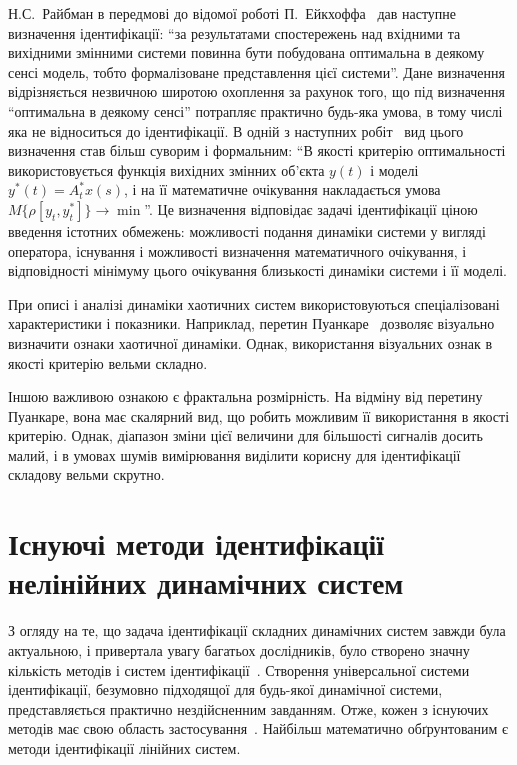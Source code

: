 Н.С.~Райбман в передмові до відомої роботі
П.~Ейкхоффа~\cite{eykhoff_id_base} дав наступне визначення ідентифікації:
``за результатами спостережень над вхідними та вихідними
змінними системи повинна бути побудована оптимальна в
деякому сенсі модель, тобто формалізоване представлення цієї
системи''. Дане визначення відрізняється незвичною широтою
охоплення за рахунок того, що під визначення ``оптимальна в
деякому сенсі'' потрапляє практично будь-яка умова, в тому числі яка не
відноситься до ідентифікації. В одній з наступних
робіт~\cite{raibman_id_obj_ctl} вид цього визначення став більш суворим і
формальним: ``В якості критерію оптимальності використовується
функція вихідних змінних об'єкта
$y(t) $ і моделі
$y^{*}(t) = A_t^{*} x (s) $, і на її математичне очікування накладається
умова
$ M \{\rho [y_t, y_t^{*}] \} \to{\min} $''.
Це визначення
відповідає задачі ідентифікації ціною введення істотних
обмежень: можливості подання динаміки системи у вигляді
оператора, існування і можливості визначення математичного
очікування, і відповідності мінімуму цього очікування
близькості динаміки системи і її моделі.







При описі і аналізі динаміки хаотичних систем
використовуються спеціалізовані характеристики і
показники. Наприклад, перетин Пуанкаре~\cite{moon_chaotic_vibr,
anisch_complex_vibrations_in_simple_systems, atu_st105} дозволяє візуально визначити
ознаки хаотичної динаміки. Однак, використання візуальних
ознак в якості критерію вельми складно.

Іншою важливою ознакою є фрактальна розмірність. На відміну від
перетину Пуанкаре, вона має скалярний вид, що робить можливим
її використання в якості критерію. Однак, діапазон зміни цієї
величини для більшості сигналів досить малий, і в умовах шумів
вимірювання виділити корисну для ідентифікації складову
вельми скрутно.


\section{Існуючі методи ідентифікації нелінійних динамічних систем}%

З огляду на те, що задача ідентифікації складних динамічних
систем завжди була актуальною, і привертала увагу багатьох
дослідників, було створено значну кількість методів і систем
ідентифікації~\cite{eykhoff_id_base, leondes_modern_tu, nelles_nlsys_id}. Створення
універсальної системи ідентифікації, безумовно підходящої
для будь-якої динамічної системи, представляється практично
нездійсненним завданням. Отже, кожен з існуючих методів має
свою область застосування~\cite{rastr_intro}. Найбільш математично
обґрунтованим є методи ідентифікації лінійних систем.

